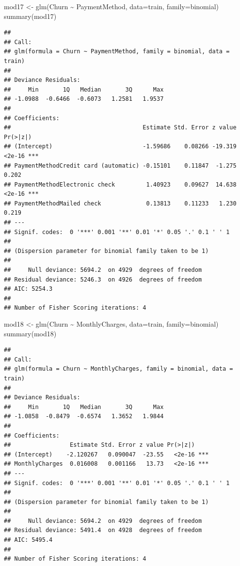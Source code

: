 \documentclass[
  twoside]{article}
\newenvironment{Shaded}{\begin{snugshade}}{\end{snugshade}}
\newcommand{\AttributeTok}[1]{\textcolor[rgb]{0.77,0.63,0.00}{#1}}
\newcommand{\FunctionTok}[1]{\textcolor[rgb]{0.00,0.00,0.00}{#1}}
\newcommand{\NormalTok}[1]{#1}
\newcommand{\OtherTok}[1]{\textcolor[rgb]{0.56,0.35,0.01}{#1}}
\newcommand{\SpecialCharTok}[1]{\textcolor[rgb]{0.00,0.00,0.00}{#1}}
\begin{document}
\begin{Shaded}
\begin{Highlighting}[]
\NormalTok{mod17 }\OtherTok{\textless{}{-}} \FunctionTok{glm}\NormalTok{(Churn }\SpecialCharTok{\textasciitilde{}}\NormalTok{ PaymentMethod, }\AttributeTok{data=}\NormalTok{train, }\AttributeTok{family=}\NormalTok{binomial)}
\FunctionTok{summary}\NormalTok{(mod17)}
\end{Highlighting}
\end{Shaded}

\begin{verbatim}
## 
## Call:
## glm(formula = Churn ~ PaymentMethod, family = binomial, data = train)
## 
## Deviance Residuals: 
##     Min       1Q   Median       3Q      Max  
## -1.0988  -0.6466  -0.6073   1.2581   1.9537  
## 
## Coefficients:
##                                      Estimate Std. Error z value Pr(>|z|)    
## (Intercept)                          -1.59686    0.08266 -19.319   <2e-16 ***
## PaymentMethodCredit card (automatic) -0.15101    0.11847  -1.275    0.202    
## PaymentMethodElectronic check         1.40923    0.09627  14.638   <2e-16 ***
## PaymentMethodMailed check             0.13813    0.11233   1.230    0.219    
## ---
## Signif. codes:  0 '***' 0.001 '**' 0.01 '*' 0.05 '.' 0.1 ' ' 1
## 
## (Dispersion parameter for binomial family taken to be 1)
## 
##     Null deviance: 5694.2  on 4929  degrees of freedom
## Residual deviance: 5246.3  on 4926  degrees of freedom
## AIC: 5254.3
## 
## Number of Fisher Scoring iterations: 4
\end{verbatim}

\begin{Shaded}
\begin{Highlighting}[]
\NormalTok{mod18 }\OtherTok{\textless{}{-}} \FunctionTok{glm}\NormalTok{(Churn }\SpecialCharTok{\textasciitilde{}}\NormalTok{ MonthlyCharges, }\AttributeTok{data=}\NormalTok{train, }\AttributeTok{family=}\NormalTok{binomial)}
\FunctionTok{summary}\NormalTok{(mod18)}
\end{Highlighting}
\end{Shaded}

\begin{verbatim}
## 
## Call:
## glm(formula = Churn ~ MonthlyCharges, family = binomial, data = train)
## 
## Deviance Residuals: 
##     Min       1Q   Median       3Q      Max  
## -1.0858  -0.8479  -0.6574   1.3652   1.9844  
## 
## Coefficients:
##                 Estimate Std. Error z value Pr(>|z|)    
## (Intercept)    -2.120267   0.090047  -23.55   <2e-16 ***
## MonthlyCharges  0.016008   0.001166   13.73   <2e-16 ***
## ---
## Signif. codes:  0 '***' 0.001 '**' 0.01 '*' 0.05 '.' 0.1 ' ' 1
## 
## (Dispersion parameter for binomial family taken to be 1)
## 
##     Null deviance: 5694.2  on 4929  degrees of freedom
## Residual deviance: 5491.4  on 4928  degrees of freedom
## AIC: 5495.4
## 
## Number of Fisher Scoring iterations: 4
\end{verbatim}
\end{document}

